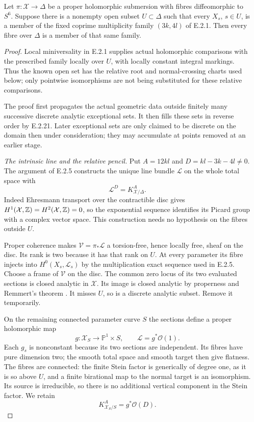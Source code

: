 \begin{proposition}
Let $\pi:\mathcal X\to\Delta$ be a proper holomorphic
submersion with fibres diffeomorphic to $S^6$.  Suppose
there is a nonempty open subset $U\subset\Delta$ such
that every $X_s$, $s\in U$, is a member of the fixed
coprime multiplicity family $(3k,4l)$ of E.2.1.
Then every fibre over $\Delta$ is a member of that
same family.
\end{proposition}
\begin{proof}
Local miniversality in E.2.1 supplies actual
holomorphic comparisons with the prescribed family
locally over $U$, with locally constant integral
markings.  Thus the known open set has the relative
root and normal-crossing charts used below; only
pointwise isomorphisms are not being substituted
for these relative comparisons.

The proof first propagates the actual geometric data
outside finitely many successive discrete analytic
exceptional sets.  It then fills these sets in reverse
order by E.2.21.  Later exceptional sets are only
claimed to be discrete on the domain then under
consideration; they may accumulate at points removed
at an earlier stage.

\emph{The intrinsic line and the relative pencil.}
Put $A=12kl$ and $D=kl-3k-4l\ne0$.
The argument of E.2.5 constructs the unique line
bundle $\mathcal L$ on the whole total space with
\[
 \mathcal L^D=K_{\mathcal X/\Delta}^{A}.
\]
Indeed Ehresmann transport over the contractible disc
gives $H^1(\mathcal X,\mathbb Z)=H^2(\mathcal X,\mathbb Z)=0$,
so the exponential sequence identifies its Picard
group with a complex vector space.  This construction
needs no hypothesis on the fibres outside $U$.

Proper coherence makes $\mathcal V=\pi_*\mathcal L$
a torsion-free, hence locally free, sheaf on the
disc.  Its rank is two because it has that rank
on $U$.  At every parameter its fibre injects
into $H^0(X_s,\mathcal L_s)$ by the multiplication
exact sequence used in E.2.5.  Choose a frame
of $\mathcal V$ on the disc.  The common zero
locus of its two evaluated sections is closed
analytic in $\mathcal X$.  Its image is closed
analytic by properness and Remmert's theorem
\cite[Chapter~II, Theorem~8.8]{Demailly2012E}.
It misses $U$, so is a discrete analytic subset.
Remove it temporarily.

On the remaining connected parameter curve $S$
the sections define a proper holomorphic map
\[
 g:\mathcal X_S\longrightarrow\mathbb P^1\times S,
 \qquad \mathcal L=g^*\mathcal O(1).
 \tag{E.2.22.1}
\]
Each $g_s$ is nonconstant because its two sections
are independent.  Its fibres have pure dimension
two; the smooth total space and smooth target
then give flatness.  The fibres are connected:
the finite Stein factor is generically of degree
one, as it is so above $U$, and a finite
birational map to the normal target is an
isomorphism.  Its source is irreducible, so
there is no additional vertical component
in the Stein factor.  We retain
\[
 K_{\mathcal X_S/S}^{A}=g^*\mathcal O(D).
 \tag{E.2.22.2}
\]


\end{proof}

